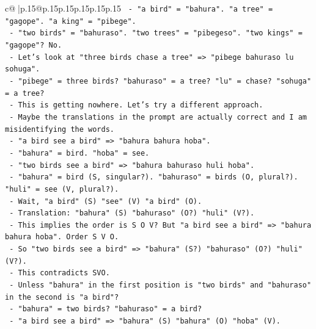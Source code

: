 \documentclass{article}
\begin{document}
{\begin{supertabular}{c@{$\;$}|p{.15\linewidth}@{}p{.15\linewidth}p{.15\linewidth}p{.15\linewidth}p{.15\linewidth}p{.15\linewidth}}
{{{\texttt{                          {-} "a bird" = "bahura". "a tree" = "gagope". "a king" = "pibege".} \\
\texttt{                          {-} "two birds" = "bahuraso". "two trees" = "pibegeso". "two kings" = "gagope"? No.} \\
\texttt{                          {-} Let's look at "three birds chase a tree" => "pibege bahuraso lu sohuga".} \\
\texttt{                            {-} "pibege" = three birds? "bahuraso" = a tree? "lu" = chase? "sohuga" = a tree?} \\
\texttt{                            {-} This is getting nowhere. Let's try a different approach.} \\
\texttt{                            {-} Maybe the translations in the prompt are actually correct and I am misidentifying the words.} \\
\texttt{                            {-} "a bird see a bird" => "bahura bahura hoba".} \\
\texttt{                              {-} "bahura" = bird. "hoba" = see.} \\
\texttt{                            {-} "two birds see a bird" => "bahura bahuraso huli hoba".} \\
\texttt{                              {-} "bahura" = bird (S, singular?). "bahuraso" = birds (O, plural?). "huli" = see (V, plural?).} \\
\texttt{                              {-} Wait, "a bird" (S) "see" (V) "a bird" (O).} \\
\texttt{                              {-} Translation: "bahura" (S) "bahuraso" (O?) "huli" (V?).} \\
\texttt{                              {-} This implies the order is S O V? But "a bird see a bird" => "bahura bahura hoba". Order S V O.} \\
\texttt{                              {-} So "two birds see a bird" => "bahura" (S?) "bahuraso" (O?) "huli" (V?).} \\
\texttt{                              {-} This contradicts SVO.} \\
\texttt{                              {-} Unless "bahura" in the first position is "two birds" and "bahuraso" in the second is "a bird"?} \\
\texttt{                              {-} "bahura" = two birds? "bahuraso" = a bird?} \\
\texttt{                              {-} "a bird see a bird" => "bahura" (S) "bahura" (O) "hoba" (V).} \\
}}}
\end{supertabular}}
\end{document}
